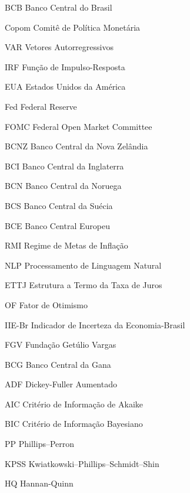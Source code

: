 
\listoffigures*
\cleardoublepage






\listoftables*
\cleardoublepage


\begin{siglas}
    \item[BCB] Banco Central do Brasil
	\item[Copom] Comitê de Política Monetária
	\item[VAR] Vetores Autorregressivos
	\item[IRF] Função de Impulso-Resposta
	\item[EUA] Estados Unidos da América
	\item[Fed] Federal Reserve
	\item[FOMC] Federal Open Market Committee
	\item[BCNZ] Banco Central da Nova Zelândia
	\item[BCI] Banco Central da Inglaterra
	\item[BCN] Banco Central da Noruega
	\item[BCS] Banco Central da Suécia
	\item[BCE] Banco Central Europeu
	\item[RMI] Regime de Metas de Inflação
	\item[NLP] Processamento de Linguagem Natural
	\item[ETTJ] Estrutura a Termo da Taxa de Juros 	
	\item[OF] Fator de Otimismo
	\item[IIE-Br] Indicador de Incerteza da Economia-Brasil
	\item[FGV] Fundação Getúlio Vargas
	\item[BCG] Banco Central da Gana
    \item[ADF] Dickey-Fuller Aumentado
    \item[AIC] Critério de Informação de Akaike
    \item[BIC] Critério de Informação Bayesiano
    \item[PP] Phillips–Perron
    \item[KPSS] Kwiatkowski–Phillips–Schmidt–Shin
    \item[HQ] Hannan-Quinn

\end{siglas}
